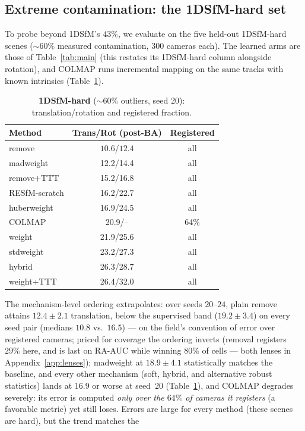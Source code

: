 \documentclass{article}
\newcommand{\mad}{madweight}
\begin{document}
\subsection{Extreme contamination: the 1DSfM-hard set}\label{sec:extreme}
To probe beyond 1DSfM's $43\%$, we evaluate on the five held-out 1DSfM-hard scenes
($\sim\!60\%$ measured contamination, $300$ cameras each). The learned arms are those of
Table~\ref{tab:main} (this restates its 1DSfM-hard column alongside rotation), and
COLMAP runs incremental mapping on the same tracks with known intrinsics
(Table~\ref{tab:hard}).
\begin{table}[t]\centering\small
\caption{\textbf{1DSfM-hard} ($\sim\!60\%$ outliers, seed 20): translation/rotation
and registered fraction.}
\label{tab:hard}
\begin{tabular}{lcc}
\toprule
Method & Trans/Rot (post-BA) & Registered\\
\midrule
remove & $\mathbf{10.6}$/$\mathbf{12.4}$ & all\\
\mad{} & 12.2/14.4 & all\\
remove+TTT & 15.2/16.8 & all\\
RESfM-scratch              & 16.2/22.7 & all\\
huberweight & 16.9/24.5 & all\\
COLMAP                     & 20.9/--   & 64\%\\
weight & 21.9/25.6 & all\\
stdweight & 23.2/27.3 & all\\
hybrid & 26.3/28.7 & all\\
weight+TTT & 26.4/32.0 & all\\
\bottomrule
\end{tabular}
\end{table}
The mechanism-level ordering extrapolates: over seeds $20$--$24$, plain remove attains
$12.4\pm2.1$ translation, below the supervised band ($19.2\pm3.4$) on every seed pair
(medians $10.8$ vs.\ $16.5$) --- on the field's convention of error over registered
cameras; priced for coverage the ordering inverts (removal registers $29\%$ here, and
is last on RA-AUC while winning $80\%$ of cells --- both lenses in
Appendix~\ref{app:lenses}); \mad{} at $18.9\pm4.1$ statistically matches the
baseline, and every other mechanism (soft, hybrid, and alternative robust
statistics) lands at $16.9$ or worse at seed~20 (Table~\ref{tab:hard}), and COLMAP degrades severely: its error is computed
\emph{only over the $64\%$ of cameras it registers} (a favorable metric) yet still loses.
Errors are large for every method (these scenes are hard), but the trend matches the
\end{document}
